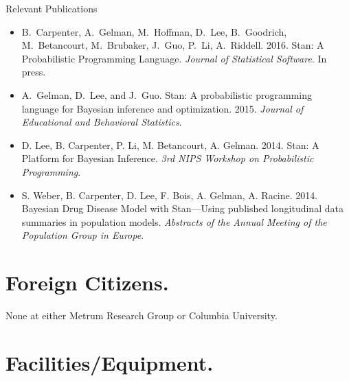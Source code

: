 \noindent
{\sc Relevant Publications}
\vspace*{-3pt}
\begin{itemize}
\item B.\ Carpenter, A.\ Gelman, M.\ Hoffman, D.\ Lee, B.\ Goodrich,
  M.\ Betancourt, M.\ Brubaker, J.\ Guo, P.\ Li, A.\ Riddell. 2016.
  Stan: A Probabilistic Programming Language. {\it Journal of
    Statistical Software}.  In press.
\item A.\ Gelman, D.\ Lee, and J.\ Guo. Stan: A probabilistic
  programming language for Bayesian inference and
  optimization. 2015. {\it Journal of Educational and Behavioral
    Statistics}.
\item D. Lee, B. Carpenter, P. Li, M. Betancourt, A. Gelman. 2014. Stan: A
  Platform for Bayesian Inference. {\it 3rd NIPS Workshop on
    Probabilistic Programming}.
\item S. Weber, B. Carpenter, D. Lee, F. Bois, A. Gelman,
  A. Racine. 2014. Bayesian Drug Disease Model with Stan---Using published
  longitudinal data summaries in population models. {\it
    Abstracts of the Annual Meeting of the Population Group in
    Europe}.
\end{itemize}



\section{Foreign Citizens.}


None at either Metrum Research Group or Columbia University.

\section{Facilities/Equipment.}

